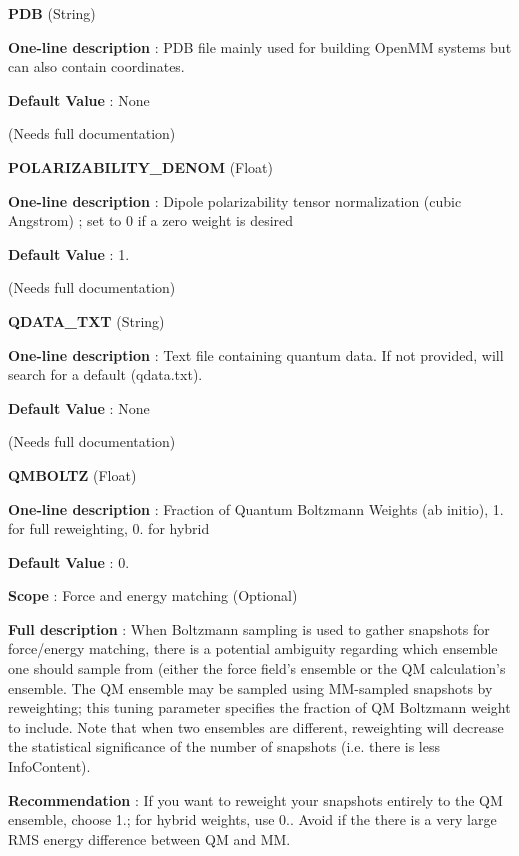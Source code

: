 \begin{DoxyItemize}
\item {\bfseries  P\-D\-B } (String) \par
{\bfseries  One-\/line description }\-: P\-D\-B file mainly used for building Open\-M\-M systems but can also contain coordinates. \par
{\bfseries  Default Value }\-: None \par
(Needs full documentation)\end{DoxyItemize}
\begin{DoxyItemize}
\item {\bfseries  P\-O\-L\-A\-R\-I\-Z\-A\-B\-I\-L\-I\-T\-Y\-\_\-\-D\-E\-N\-O\-M } (Float) \par
{\bfseries  One-\/line description }\-: Dipole polarizability tensor normalization (cubic Angstrom) ; set to 0 if a zero weight is desired \par
{\bfseries  Default Value }\-: 1. \par
(Needs full documentation)\end{DoxyItemize}
\begin{DoxyItemize}
\item {\bfseries  Q\-D\-A\-T\-A\-\_\-\-T\-X\-T } (String) \par
{\bfseries  One-\/line description }\-: Text file containing quantum data. If not provided, will search for a default (qdata.\-txt). \par
{\bfseries  Default Value }\-: None \par
(Needs full documentation)\end{DoxyItemize}
\begin{DoxyItemize}
\item {\bfseries  Q\-M\-B\-O\-L\-T\-Z } (Float) \par
{\bfseries  One-\/line description }\-: Fraction of Quantum Boltzmann Weights (ab initio), 1. for full reweighting, 0. for hybrid \par
{\bfseries  Default Value }\-: 0. \par
{\bfseries  Scope }\-: Force and energy matching (Optional) \par
{\bfseries  Full description }\-: When Boltzmann sampling is used to gather snapshots for force/energy matching, there is a potential ambiguity regarding which ensemble one should sample from (either the force field's ensemble or the Q\-M calculation's ensemble. The Q\-M ensemble may be sampled using M\-M-\/sampled snapshots by reweighting; this tuning parameter specifies the fraction of Q\-M Boltzmann weight to include. Note that when two ensembles are different, reweighting will decrease the statistical significance of the number of snapshots (i.\-e. there is less Info\-Content). \par
{\bfseries  Recommendation }\-: If you want to reweight your snapshots entirely to the Q\-M ensemble, choose 1.; for hybrid weights, use 0.. Avoid if the there is a very large R\-M\-S energy difference between Q\-M and M\-M.\end{DoxyItemize}
